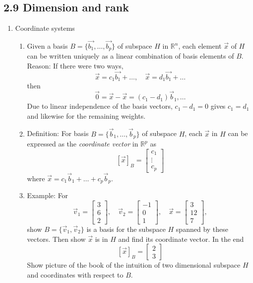 \documentclass{article}
\begin{document}
\subsection{2.9 Dimension and rank}

\begin{enumerate}

\item Coordinate systems
\begin{enumerate}
\item Given a basis $B=\{\vec{b_1}, \dots, \vec{b_p}\}$ of subspace $H$ in $\mathbb{R}^n$, each element $\vec{x}$ of $H$ can be written uniquely as a linear combination of basis elements of $B$. Reason: If there were two ways, 
\[
\vec{x} = c_1 \vec{b_1} + \dots, \quad \vec{x} = d_1 \vec{b_1} + \dots
\]
then
\[
\vec{0} = \vec{x}-\vec{x} = (c_1-d_1)\vec{b}_1, \dots
\]
Due to linear independence of the basis vectors, $c_1-d_1=0$ gives $c_1=d_1$ and likewise for the remaining weights.

\item Definition: For basis $B = \{ \vec{b}_1, \dots, \vec{b}_p \}$ of subspace $H$, each $\vec{x}$ in $H$ can be expressed as the \emph{coordinate vector} in $\mathbb{R}^p$ as
\[
\left[\vec{x} \right]_B = \left[
\begin{array}{c}
c_1 \\ \vdots \\ c_p
\end{array}\right]
\]
where $\vec{x} = c_1 \vec{b}_1 + \dots + c_p \vec{b}_p$.


\item Example: For
\[
\vec{v}_1 = \left[
\begin{array}{c}
3 \\ 6 \\ 2
\end{array} \right], \quad
\vec{v}_2 = \left[
\begin{array}{c}
-1 \\ 0 \\ 1
\end{array} \right], \quad
\vec{x} = \left[
\begin{array}{c}
3 \\ 12 \\ 7
\end{array} \right],
\]
show $B = \{\vec{v}_1, \vec{v}_2\}$ is a basis for the subspace $H$ spanned by these vectors. Then show $\vec{x}$ is in $H$ and find its coordinate vector. In the end
\[
\left[ \vec{x} \right]_B = \left[
\begin{array}{c}
2 \\ 3
\end{array}
\right]
\]
Show picture of the book of the intuition of two dimensional subspace $H$ and coordinates with respect to $B$.


\end{enumerate}
\end{enumerate}
\end{document}
